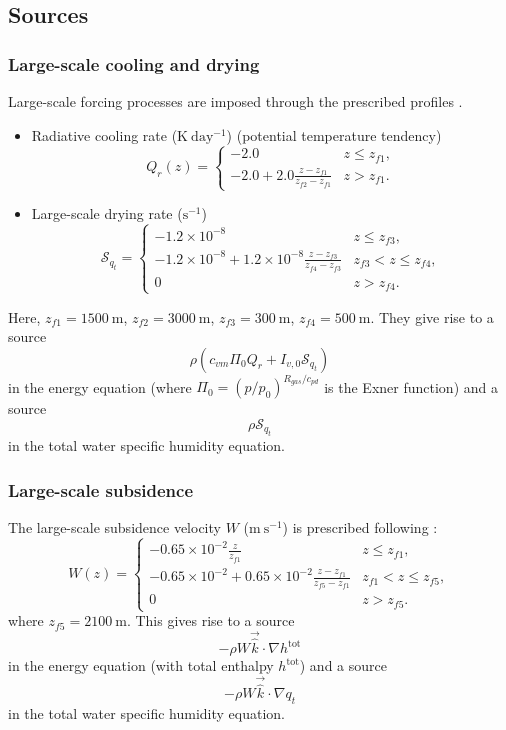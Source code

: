 \documentclass{report}
\begin{document}
\subsection{Sources}

\subsubsection{Large-scale cooling and drying}

Large-scale forcing processes are imposed through the prescribed profiles  \citep{Siebesma2003}. 
\begin{itemize}
    \item Radiative cooling rate ($\mathrm{K~day^{-1}}$) (potential temperature tendency)
\begin{equation}\label{e:bomex_forcing_qrad}
Q_r(z) = 
    \begin{cases}
    -2.0 & z\leq z_{f1},\\
    -2.0 + 2.0\frac{z-z_{f1}}{z_{f2}-z_{f1}} &  z > z_{f1}.
    \end{cases}
\end{equation}
\item Large-scale drying rate ($\mathrm{s^{-1}}$)
\begin{equation}\label{e:bomex_forcing_dqtdt}
\mathcal{S}_{q_t} = 
    \begin{cases}
    -1.2\times10^{-8} & z\leq z_{f3},\\
    -1.2\times10^{-8} + 1.2\times10^{-8}\frac{z-z_{f3}}{z_{f4}-z_{f3}} &  z_{f3} < z\leq z_{f4},\\
    0 & z > z_{f4}.
    \end{cases}
\end{equation}
\end{itemize}
Here, $z_{f1}=1500~\mathrm{m}$, $z_{f2}=3000~\mathrm{m}$, $z_{f3}=300~\mathrm{m}$, $z_{f4}=500~\mathrm{m}$. They give rise to a source 
\[
\rho (c_{vm}\Pi_0 Q_r + I_{v,0}\mathcal{S}_{q_t})
\]
in the energy equation (where $\Pi_0 = \left( p/p_0 \right)^{R_{gas}/c_{pd}}$ is the Exner function) and a source
\[
\rho \mathcal{S}_{q_t}
\]
in the total water specific humidity equation.

\subsubsection{Large-scale subsidence}
The large-scale subsidence velocity $W$ ($\mathrm{m~s^{-1}}$) is prescribed following \cite{Siebesma2003}:
\begin{equation}\label{e:bomex_forcing_sub}
W(z) = 
    \begin{cases}
    -0.65\times10^{-2}\frac{z}{z_{f1}} & z\leq z_{f1},\\
    -0.65\times10^{-2} + 0.65\times10^{-2}\frac{z-z_{f1}}{z_{f5}-z_{f1}} &  z_{f1} < z\leq z_{f5}, \\
    0 & z > z_{f5}.
    \end{cases}
\end{equation}
where $z_{f5}=2100~\mathrm{m}$. This gives rise to a source
\[
-\rho W \vec{\hat k} \cdot \nabla h^\mathrm{tot}
\]
in the energy equation (with total enthalpy $h^\mathrm{tot}$) and a source
\[
-\rho W \vec{\hat k} \cdot \nabla q_t
\]
in the total water specific humidity equation.
\end{document}
